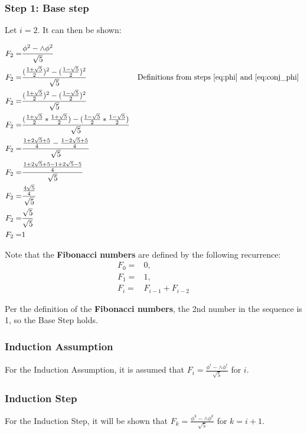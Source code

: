 \documentclass[11pt,letterpaper]{article}
\begin{document}
\subsubsection*{Step 1: Base step}
Let $i = 2$. It can then be shown:

\Large
\begin{eqnarray}
	F_2	=	& \frac{ \phi^2 - \wedge\phi^2 }{ \sqrt{5} } 			
				&	\\
	F_2 =	& \frac{ ( \frac{ 1 + \sqrt{5} }{ 2 } )^2 - ( \frac{ 1 - \sqrt{5} }{ 2 } )^2 }{ \sqrt{5} } 
				& \mbox{Definitions from steps \ref{eq:phi} and \ref{eq:conj_phi} } \\
	F_2 =	& \frac{ ( \frac{ 1 + \sqrt{5} }{ 2 } )^2 - ( \frac{ 1 - \sqrt{5} }{ 2 } )^2 }{ \sqrt{5} } 
				& 	\\
	F_2 =	& \frac{ 
				( \frac{ 1 + \sqrt{5} }{ 2 } * \frac{ 1 + \sqrt{5} }{ 2 }) - 
				( \frac{ 1 - \sqrt{5} }{ 2 } * \frac{ 1 - \sqrt{5} }{ 2 })
				}
				{ \sqrt{5} } 
				& 	\\
	F_2	=	& \frac{ \frac{1 + 2\sqrt{5} + 5}{4} - \frac{1 - 2\sqrt{5} + 5}{4} }
				{ \sqrt{5} } 
				& \\
	F_2 =	& \frac{ \frac{ 1 + 2\sqrt{5} + 5 - 1 + 2\sqrt{5} - 5 }{ 4 } }
				{ \sqrt{5} }
				& \\
	F_2 =	& \frac{ \frac{ 4\sqrt{5} }{ 4 } }
				{ \sqrt{5} }
				& \\
	F_ 2 =	& \frac{\sqrt{5}}{\sqrt{5}}
				& \\
	F_2 = 	& 1
				& 
\end{eqnarray}
\normalsize

Note that the \textbf{Fibonacci numbers} are defined by the following recurrence:
\begin{eqnarray}
	F_0 = 	& 0, \\
	F_1 = 	& 1, \\
	F_i =	& F_{i-1} + F_{i-2} \label{eq:fib_nums1}
\end{eqnarray}

Per the definition of the \textbf{Fibonacci numbers}, the 2nd number in the sequence is 1, so the Base Step
holds.

\subsubsection*{Induction Assumption}
For the Induction Assumption, it is assumed that $ F_i = \frac{ \phi^i - \wedge\phi^i }{ \sqrt{5} } $ for $i$.

\subsubsection*{Induction Step}
For the Induction Step, it will be shown that $ F_k = \frac{ \phi^k - \wedge\phi^k }{ \sqrt{5} } $ for $k = i + 1$.
\end{document}
